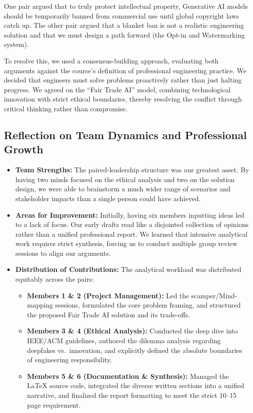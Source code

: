 One pair argued that to truly protect intellectual property, Generative AI models should be temporarily banned from commercial use until global copyright laws catch up. The other pair argued that a blanket ban is not a realistic engineering solution and that we must design a path forward (the Opt-in and Watermarking system).

To resolve this, we used a consensus-building approach, evaluating both arguments against the course's definition of professional engineering practice. We decided that engineers must solve problems proactively rather than just halting progress. We agreed on the ``Fair Trade AI'' model, combining technological innovation with strict ethical boundaries, thereby resolving the conflict through critical thinking rather than compromise.

\subsection{Reflection on Team Dynamics and Professional Growth}\label{sec:team-dynamics}
\begin{itemize}
    \item \textbf{Team Strengths:} The paired-leadership structure was our greatest asset. By having two minds focused on the ethical analysis and two on the solution design, we were able to brainstorm a much wider range of scenarios and stakeholder impacts than a single person could have achieved.
    \item \textbf{Areas for Improvement:} Initially, having six members inputting ideas led to a lack of focus. Our early drafts read like a disjointed collection of opinions rather than a unified professional report. We learned that intensive analytical work requires strict synthesis, forcing us to conduct multiple group review sessions to align our arguments.
    \item \textbf{Distribution of Contributions:} The analytical workload was distributed equitably across the pairs:
    \begin{itemize}
        \item {}\textbf{Members 1 \& 2 (Project Management):} Led the \acs{scamper}/Mind-mapping sessions, formulated the core problem framing, and structured the proposed Fair Trade AI solution and its trade-offs.
        \item \textbf{Members 3 \& 4 (Ethical Analysis):} Conducted the deep dive into IEEE/ACM guidelines, authored the dilemma analysis regarding deepfakes vs.\ innovation, and explicitly defined the absolute boundaries of engineering responsibility.
        \item \textbf{Members 5 \& 6 (Documentation \& Synthesis):} Managed the LaTeX source code, integrated the diverse written sections into a unified narrative, and finalized the report formatting to meet the strict 10--15 page requirement.
    \end{itemize}
\end{itemize}
